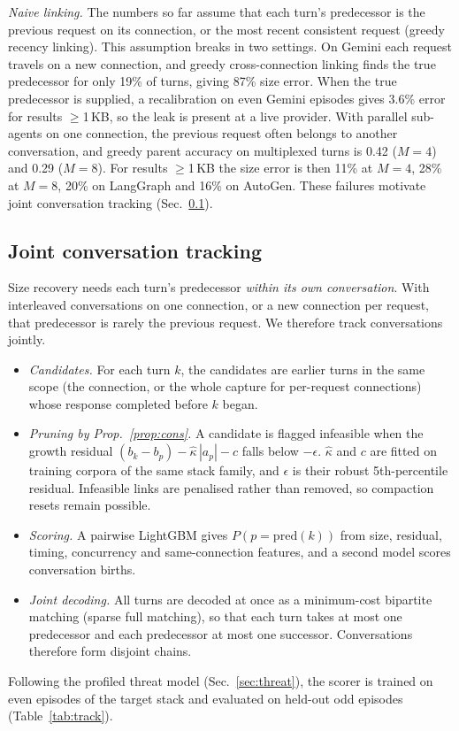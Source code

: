 \emph{Naive linking.} The numbers so far assume that each turn's predecessor is the previous request on its connection, or the most recent consistent request (greedy recency linking). This assumption breaks in two settings. On Gemini each request travels on a new connection, and greedy cross-connection linking finds the true predecessor for only 19\% of turns, giving 87\% size error. When the true predecessor is supplied, a recalibration on even Gemini episodes gives 3.6\% error for results $\geq$1\,KB, so the leak is present at a live provider. With parallel sub-agents on one connection, the previous request often belongs to another conversation, and greedy parent accuracy on multiplexed turns is 0.42 ($M{=}4$) and 0.29 ($M{=}8$). For results $\geq$1\,KB the size error is then 11\% at $M{=}4$, 28\% at $M{=}8$, 20\% on LangGraph and 16\% on AutoGen. These failures motivate joint conversation tracking (Sec.~\ref{sec:track}).

\subsection{Joint conversation tracking}\label{sec:track}
Size recovery needs each turn's predecessor \emph{within its own conversation}. With interleaved conversations on one connection, or a new connection per request, that predecessor is rarely the previous request. We therefore track conversations jointly.
\begin{itemize}
\item \emph{Candidates.} For each turn $k$, the candidates are earlier turns in the same scope (the connection, or the whole capture for per-request connections) whose response completed before $k$ began.
\item \emph{Pruning by Prop.~\ref{prop:cons}.} A candidate is flagged infeasible when the growth residual $(b_k - b_p) - \hat\kappa\,|a_p| - c$ falls below $-\epsilon$. $\hat\kappa$ and $c$ are fitted on training corpora of the same stack family, and $\epsilon$ is their robust 5th-percentile residual. Infeasible links are penalised rather than removed, so compaction resets remain possible.
\item \emph{Scoring.} A pairwise LightGBM gives $P(p = \mathrm{pred}(k))$ from size, residual, timing, concurrency and same-connection features, and a second model scores conversation births.
\item \emph{Joint decoding.} All turns are decoded at once as a minimum-cost bipartite matching (sparse full matching), so that each turn takes at most one predecessor and each predecessor at most one successor. Conversations therefore form disjoint chains.
\end{itemize}
Following the profiled threat model (Sec.~\ref{sec:threat}), the scorer is trained on even episodes of the target stack and evaluated on held-out odd episodes (Table~\ref{tab:track}).

